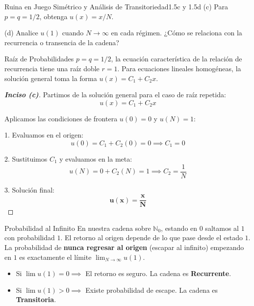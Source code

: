 \documentclass[10pt,a4paper]{article}
\begin{document}
\newpage

\vspace{5mm}

\begin{ejercicio}{Ruina en Juego Simétrico y Análisis de Transitoriedad}{1.5c y 1.5d}
    (c) Para $p = q = 1/2$, obtenga $u(x) = x/N$.

    (d) Analice $u(1)$ cuando $N \to \infty$ en cada régimen. ¿Cómo se relaciona con la recurrencia o transencia de la cadena?
\end{ejercicio}

\vspace{2mm}

\begin{nota}{Raíz de Probabilidades}
     $p = q = 1/2$, 
    la ecuación característica de la relación de recurrencia tiene una raíz doble 
    $r=1$. Para ecuaciones lineales homogéneas, la solución general toma la forma 
    $u(x) = C_1 + C_2 x$.
\end{nota}

\vspace{2mm}

\begin{proof}[\textbf{Inciso (c)}]
    Partimos de la solución general para el caso de raíz repetida:
    \[ u(x) = C_1 + C_2 x \]
    
    Aplicamos las condiciones de frontera $u(0) = 0$ y $u(N) = 1$:
    
    1. Evaluamos en el origen:
    \[ u(0) = C_1 + C_2(0) = 0 \implies C_1 = 0 \]
    
    2. Sustituimos $C_1$ y evaluamos en la meta:
    \[ u(N) = 0 + C_2(N) = 1 \implies C_2 = \frac{1}{N} \]
    
    3. Solución final:
    \[ \mathbf{u(x) = \frac{x}{N}} \]
    
\end{proof}

\vspace{5mm}

\begin{alerta}{Probabilidad al Infinito}
    En nuestra cadena sobre $\mathbb{N}_0$, estando en $0$ saltamos al $1$ con probabilidad $1$. El retorno al origen depende de lo que pase desde el estado $1$.
    La probabilidad de \textbf{nunca regresar al origen} (escapar al infinito) empezando en $1$ es exactamente el límite $\lim_{N \to \infty} u(1)$.
    \begin{itemize}
        \item Si $\lim u(1) = 0 \implies$ El retorno es seguro. La cadena es \textbf{Recurrente}.
        \item Si $\lim u(1) > 0 \implies$ Existe probabilidad de escape. La cadena es \textbf{Transitoria}.
    \end{itemize}
\end{alerta}
\end{document}
